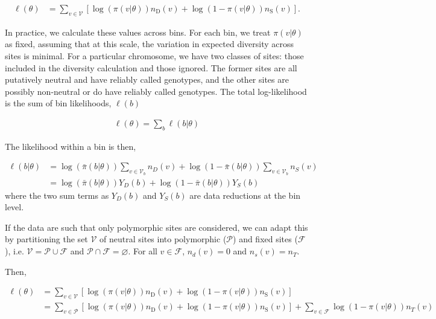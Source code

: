 \documentclass[11pt]{article}
\begin{document}
\begin{align}
  \ell(\theta) &= \sum_{v \in \mathcal{V}} \left[\log(\pi(v | \theta)) n_\text{D}(v) + \log(1-\pi(v | \theta)) n_\text{S}(v)\right].
\end{align}

In practice, we calculate these values across bins. For each bin, we treat
$\pi(v | \theta)$ as fixed, assuming that at this scale, the variation in
expected diversity across sites is minimal. For a particular chromosome, we
have two classes of sites: those included in the diversity calculation and
those ignored. The former sites are all putatively neutral and have reliably
called genotypes, and the other sites are possibly non-neutral or do have
reliably called genotypes. The total log-likelihood is the sum of bin likelihoods,
$\ell(b)$

\begin{align}
   \ell(\theta) =  \sum_b \ell(b | \theta)
\end{align}

The likelihood within a bin is then,

\begin{align}
  \ell(b | \theta)  &= \log(\bar{\pi}(b | \theta)) \sum_{v \in \mathcal{V}_b} n_D(v) + \log(1-\bar{\pi}(b | \theta)) \sum_{v \in \mathcal{V}_b} n_S(v)  \\
                               &= \log(\bar{\pi}(b | \theta)) Y_D(b) + \log(1-\bar{\pi}(b | \theta)) Y_S(b)
\end{align}
%
where the two sum terms as $Y_D(b)$ and $Y_S(b)$ are data reductions at the bin
level.

If the data are such that only polymorphic sites are considered, we can adapt
this by partitioning the set $\mathcal{V}$ of neutral sites into polymorphic
($\mathcal{P}$) and fixed sites ($\mathcal{F}$), i.e. $\mathcal{V} =
\mathcal{P} \cup \mathcal{F}$ and $\mathcal{P} \cap \mathcal{F} = \varnothing$.
For all $v \in \mathcal{F}$, $n_d(v) = 0$ and $n_s(v) = n_T$.

Then, 

\begin{align}
  \ell(\theta) &= \sum_{v \in \mathcal{V}} \left[\log(\pi(v | \theta)) n_\text{D}(v) + \log(1-\pi(v | \theta)) n_\text{S}(v)\right] \\
                  &= \sum_{v \in \mathcal{P}} \left[\log(\pi(v | \theta)) n_\text{D}(v) + \log(1-\pi(v | \theta)) n_\text{S}(v)\right] + \sum_{v \in \mathcal{F}} \log(1-\pi(v | \theta)) n_T(v)  \\
\end{align}
\end{document}
